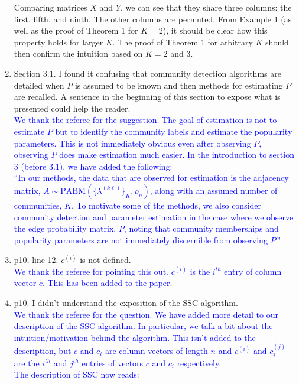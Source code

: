 \documentclass[
]{article}
\begin{document}
\begin{enumerate}
{  Comparing matrices $X$ and $Y$, we can see that they share three columns: the first, fifth, and ninth. 
  The other columns are permuted. 
  From Example 1 (as well as the proof of Theorem 1 for $K = 2$), it should be clear how this property holds for larger $K$. 
  The proof of Theorem 1 for arbitrary $K$ should then confirm the intuition based on $K = 2$ and $3$. 
  }
\item
  Section 3.1. I found it confusing that community detection algorithms
  are detailed when \(P\) is assumed to be known and then methods for
  estimating \(P\) are recalled. A sentence in the beginning of this
  section to expose what is presented could help the reader.\\
  \textcolor{blue}{
  We thank the referee for the suggestion. 
  The goal of estimation is not to estimate $P$ but to identify the community labels and estimate the popularity parameters. 
  This is not immediately obvious even after observing $P$, observing $P$ does make estimation much easier. 
  In the introduction to section 3 (before 3.1), we have added the following:
  }\\
  \textcolor{blue}{
  ``In our methods, the data that are observed for estimation is the adjacency matrix, $A \sim \mathrm{PABM}(\{\lambda^{(k \ell)}\}_K, \rho_n)$, along with an assumed number of communities, $K$. 
  To motivate some of the methods, we also consider community detection and parameter estimation in the case where we observe the edge probability matrix, $P$, noting that community memberships and popularity parameters are not immediately discernible from observing $P$.''
  }
\item
  p10, line 12. \(c^{(i)}\) is not defined.\\
  \textcolor{blue}{
  We thank the referee for pointing this out. 
  $c^{(i)}$ is the $i^{th}$ entry of column vector $c$. 
  This has been added to the paper.
  }
\item
  p10. I didn't understand the exposition of the SSC algorithm.\\
  \textcolor{blue}{
  We thank the referee for the question. 
  We have added more detail to our description of the SSC algorithm. 
  In particular, we talk a bit about the intuition/motivation behind the algorithm. 
  This isn't added to the description, but $c$ and $c_i$ are column vectors of length $n$ and $c^{(i)}$ and $c_i^{(j)}$ are the $i^{th}$ and $j^{th}$ entries of vectors $c$ and $c_i$ respectively. 
  }\\
  \textcolor{blue}{The description of SSC now reads:
}
\end{enumerate}
\end{document}
